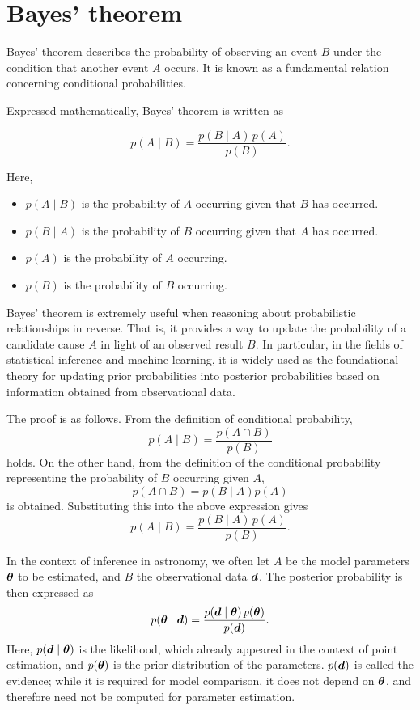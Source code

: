 \section{Bayes' theorem}

Bayes' theorem describes the probability of observing an event $B$ under the condition that another event $A$ occurs. It is known as a fundamental relation concerning conditional probabilities.

Expressed mathematically, Bayes' theorem is written as

\[
p(A \mid B) = \frac{p(B \mid A)\,p(A)}{p(B)}.
\]

Here,
\begin{itemize}
  \item $p(A \mid B)$ is the probability of $A$ occurring given that $B$ has occurred.
  \item $p(B \mid A)$ is the probability of $B$ occurring given that $A$ has occurred.
  \item $p(A)$ is the probability of $A$ occurring.
  \item $p(B)$ is the probability of $B$ occurring.
\end{itemize}

Bayes' theorem is extremely useful when reasoning about probabilistic relationships in reverse. That is, it provides a way to update the probability of a candidate cause $A$ in light of an observed result $B$. In particular, in the fields of statistical inference and machine learning, it is widely used as the foundational theory for updating prior probabilities into posterior probabilities based on information obtained from observational data.

The proof is as follows. From the definition of conditional probability,
\[
p(A \mid B) = \frac{p(A \cap B)}{p(B)}
\]
holds. On the other hand, from the definition of the conditional probability representing the probability of $B$ occurring given $A$,
\[
p(A \cap B) = p(B \mid A) p(A)
\]
is obtained. Substituting this into the above expression gives
\[
p(A \mid B) = \frac{p(B \mid A)\,p(A)}{p(B)}.
\]

In the context of inference in astronomy, we often let $A$ be the model parameters $\boldsymbol{\theta}$ to be estimated, and $B$ the observational data $\boldsymbol{d}$. The posterior probability is then expressed as
\[
p(\boldsymbol{\theta} \mid \boldsymbol{d}) = \frac{p(\boldsymbol{d} \mid \boldsymbol{\theta})\,p(\boldsymbol{\theta})}{p(\boldsymbol{d})}.
\]
Here, $p(\boldsymbol{d} \mid \boldsymbol{\theta})$ is the likelihood, which already appeared in the context of point estimation, and $p(\boldsymbol{\theta})$ is the prior distribution of the parameters. $p(\boldsymbol{d})$ is called the evidence; while it is required for model comparison, it does not depend on $\boldsymbol{\theta}$, and therefore need not be computed for parameter estimation.

